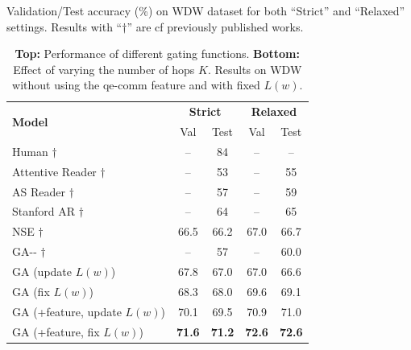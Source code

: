 \documentclass[11pt,a4paper]{article}
\begin{document}
\begin{table}[ht]
\parbox{.60\linewidth}{
\centering
\caption{\small Validation/Test accuracy (\%) on WDW dataset for both ``Strict'' and ``Relaxed'' settings. Results with ``$\dagger$'' are cf previously published works.}
\label{tab:wdw}
\begin{tabular}{l|cc|cc}
\toprule
\multirow{2}{*}{\textbf{Model}}  & \multicolumn{2}{c|}{\textbf{Strict}}              & \multicolumn{2}{c}{\textbf{Relaxed}}              \\ \cmidrule(l){2-5} 
                        & \multicolumn{1}{c|}{Val} & Test          & \multicolumn{1}{c|}{Val} & Test          \\ \midrule
Human  $\dagger$                 & --                       & 84          & --                       & --            \\ \midrule
Attentive Reader   $\dagger$     & --                       & 53          & --                       & 55         \\
AS Reader   $\dagger$            & --                       & 57          & --                       & 59          \\
Stanford AR    $\dagger$         & --                       & 64          & --                       & 65          \\
NSE $\dagger$& 66.5                     & 66.2          & 67.0                     & 66.7          \\ \midrule
GA-{}-  $\dagger$             & --                     & 57          & --                     & 60.0          \\
GA (update $L(w)$)              & 67.8                     & 67.0          & 67.0                     & 66.6          \\
GA (fix $L(w)$)              & 68.3                     & 68.0          & 69.6                     & 69.1          \\
GA (+feature, update $L(w)$)    & 70.1            & 69.5 & 70.9            & 71.0 \\
GA (+feature, fix $L(w)$)    & \textbf{71.6}            & \textbf{71.2} & \textbf{72.6}            & \textbf{72.6} \\\bottomrule
\end{tabular}
}
\hfill
\parbox{.375\linewidth}{
\centering
\caption{\small \textbf{Top:} Performance of different gating functions. \textbf{Bottom:} Effect of varying the number of hops $K$. Results on WDW without using the qe-comm feature and with fixed $L(w)$.}
\label{tab:gating_fn}
}
\end{table}
\end{document}
